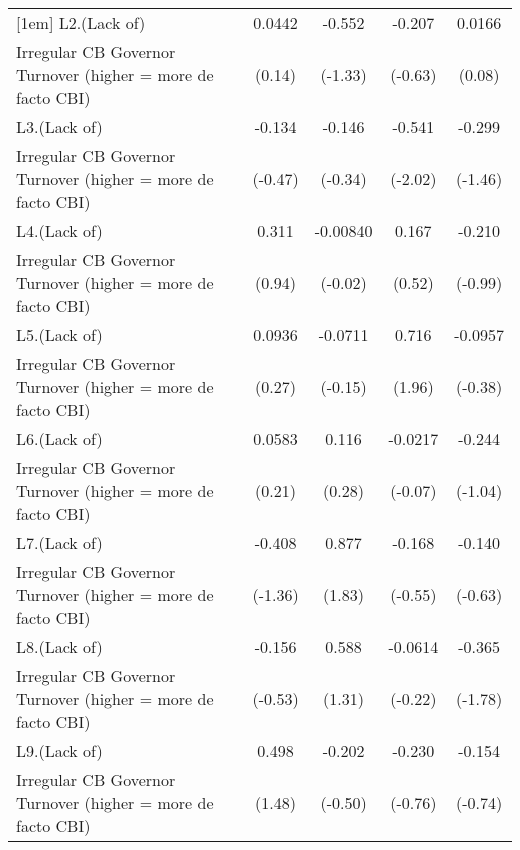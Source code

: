 {\begin{tabular}{l*{4}{c}}
[1em]
L2.(Lack of)        &      0.0442         &      -0.552         &      -0.207         &      0.0166         \\
Irregular CB Governor Turnover (higher = more de facto CBI)&      (0.14)         &     (-1.33)         &     (-0.63)         &      (0.08)         \\
[1em]
L3.(Lack of)        &      -0.134         &      -0.146         &      -0.541\sym{*}  &      -0.299         \\
Irregular CB Governor Turnover (higher = more de facto CBI)&     (-0.47)         &     (-0.34)         &     (-2.02)         &     (-1.46)         \\
[1em]
L4.(Lack of)        &       0.311         &    -0.00840         &       0.167         &      -0.210         \\
Irregular CB Governor Turnover (higher = more de facto CBI)&      (0.94)         &     (-0.02)         &      (0.52)         &     (-0.99)         \\
[1em]
L5.(Lack of)        &      0.0936         &     -0.0711         &       0.716         &     -0.0957         \\
Irregular CB Governor Turnover (higher = more de facto CBI)&      (0.27)         &     (-0.15)         &      (1.96)         &     (-0.38)         \\
[1em]
L6.(Lack of)        &      0.0583         &       0.116         &     -0.0217         &      -0.244         \\
Irregular CB Governor Turnover (higher = more de facto CBI)&      (0.21)         &      (0.28)         &     (-0.07)         &     (-1.04)         \\
[1em]
L7.(Lack of)        &      -0.408         &       0.877         &      -0.168         &      -0.140         \\
Irregular CB Governor Turnover (higher = more de facto CBI)&     (-1.36)         &      (1.83)         &     (-0.55)         &     (-0.63)         \\
[1em]
L8.(Lack of)        &      -0.156         &       0.588         &     -0.0614         &      -0.365         \\
Irregular CB Governor Turnover (higher = more de facto CBI)&     (-0.53)         &      (1.31)         &     (-0.22)         &     (-1.78)         \\
[1em]
L9.(Lack of)        &       0.498         &      -0.202         &      -0.230         &      -0.154         \\
Irregular CB Governor Turnover (higher = more de facto CBI)&      (1.48)         &     (-0.50)         &     (-0.76)         &     (-0.74)         \\

\end{tabular}}
